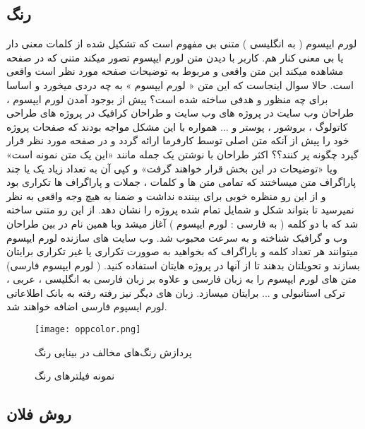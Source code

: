 \subsection{رنگ}
لورم ایپسوم ( به انگلیسی  ) متنی بی مفهوم است که تشکیل شده از کلمات معنی دار یا بی معنی کنار هم. کاربر با دیدن متن لورم ایپسوم تصور میکند متنی که در صفحه مشاهده میکند این متن واقعی و مربوط به توضیحات صفحه مورد نظر است واقعی است. حالا سوال اینجاست که این متن « لورم ایپسوم » به چه دردی میخورد و اساسا برای چه منظور و هدفی ساخته شده است؟ پیش از بوجود آمدن لورم ایپسوم ، طراحان وب سایت در پروژه های وب سایت و طراحان کرافیک در پروژه های طراحی کاتولوگ ، بروشور ، پوستر و ... همواره با این مشکل مواجه بودند که صفحات پروژه خود را پیش از آنکه متن اصلی توسط کارفرما ارائه گردد و در صفحه مورد نظر قرار گیرد چگونه پر کنند؟؟ اکثر طراحان با نوشتن یک جمله مانند «این یک متن نمونه است» ویا «توضیحات در این بخش قرار خواهند گرفت» و کپی آن به تعداد زیاد یک یا چند پاراگراف متن میساختند که تمامی متن ها و کلمات ، جملات و پاراگراف ها تکراری بود و از این رو منظره خوبی برای بیننده نداشت و ضمنا به هیچ وجه واقعی به نظر نمیرسید تا بتواند شکل و شمایل تمام شده پروژه را نشان دهد. از این رو متنی ساخته شد که با دو کلمه ( به فارسی : لورم ایپسوم ) آغاز میشد وبا همین نام در بین طراحان وب و گرافیک شناخته و به سرعت محبوب شد. وب سایت های سازنده لورم ایپسوم میتوانند هر تعداد کلمه و پاراگراف که بخواهید به صوورت تکراری یا غیر تکراری برایتان بسازند و تحویلتان بدهند تا از آنها در پروژه هایتان استفاده کنید. ( لورم ایپسوم فارسی) متن های لورم ایپسوم را به زبان فارسی و علاوه بر زبان فارسی به انگلیسی ، عربی ، ترکی استانبولی و ... برایتان میسازد. زبان های دیگر نیز رفته رفته به بانک اطلاعاتی لورم ایسپوم فارسی اضافه خواهند شد.  


\begin{figure}[!htb]
\centering     %
\texttt{[image: oppcolor.png]}
\caption[رنگ‌های مخالف]{
پردازش رنگ‌های مخالف در بینایی رنگ \cite{ wiki:hsl}
}
\label{fig:oppcolor}
\end{figure}


\begin{figure}[htb]
\centering     %
{}\hspace{-2mm}
\caption{نمونه فیلترهای رنگ}
\label{fig:color}
\end{figure}


\subsection{روش فلان}

